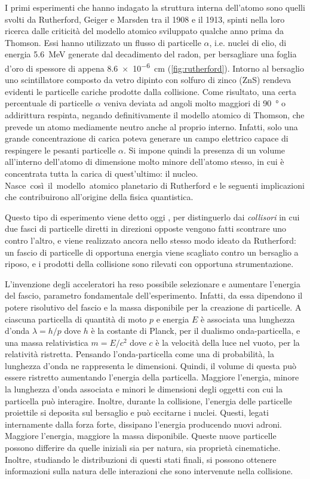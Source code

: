 \documentclass[../main.tex]{subfiles}
\begin{document}
I primi esperimenti che hanno indagato la struttura interna dell'atomo sono quelli svolti da Rutherford, Geiger e Marsden tra il 1908 e il 1913, spinti nella loro ricerca dalle criticità del modello atomico sviluppato qualche anno prima da Thomson. Essi hanno utilizzato un flusso di particelle $\alpha$, i.e. nuclei di elio, di energia \SI{5.6}{\MeV} generate dal decadimento del radon, per bersagliare una foglia d'oro di spessore di appena \SI{8.6e-6}{\cm} (\autoref{fig:rutherford}). Intorno al bersaglio uno scintillatore composto da vetro dipinto con solfuro di zinco (ZnS) rendeva evidenti le particelle cariche prodotte dalla collisione. Come risultato, una certa percentuale di particelle $\alpha$ veniva deviata ad angoli molto maggiori di \SI{90}{°} o addirittura respinta, negando definitivamente il modello atomico di Thomson, che prevede un atomo mediamente neutro anche al proprio interno. Infatti, solo una grande concentrazione di carica poteva generare un campo elettrico capace di respingere le pesanti particelle $\alpha$. Si impone quindi la presenza di un volume all'interno dell'atomo di dimensione molto minore dell'atomo stesso, in cui è concentrata tutta la carica di quest'ultimo: il nucleo. \mbox{Nasce così il modello atomico} planetario di Rutherford e le seguenti implicazioni che contribuirono all'origine della fisica quantistica.

Questo tipo di esperimento viene detto oggi , per distinguerlo dai \emph{collisori} in cui due fasci di particelle diretti in direzioni opposte vengono fatti scontrare uno contro l'altro, e viene realizzato ancora nello stesso modo ideato da Rutherford: un fascio di particelle di opportuna energia viene scagliato contro un bersaglio a riposo, e i prodotti della collisione sono rilevati con opportuna strumentazione.

L'invenzione degli acceleratori ha reso possibile selezionare e aumentare l'energia del fascio, parametro fondamentale dell'esperimento.
Infatti, da essa dipendono il potere risolutivo del fascio e la massa disponibile per la creazione di particelle.
A ciascuna particella di quantità di moto $p$ e energia $E$ è associata una lunghezza d'onda $\lambda = h / p $ dove $h$ è la costante di Planck, per il dualismo onda-particella, e una massa relativistica $m = E / c^2$ dove $c$ è la velocità della luce nel vuoto, per la relatività ristretta. 
Pensando l'onda-particella come una  di probabilità, la lunghezza d'onda ne rappresenta le dimensioni. Quindi, il volume di questa  può essere ristretto aumentando l'energia della particella. Maggiore l'energia, minore la lunghezza d'onda associata e minori le dimensioni degli oggetti con cui la particella può interagire. Inoltre, durante la collisione, l'energia delle particelle proiettile si deposita sul bersaglio e può eccitarne i nuclei. Questi, legati internamente dalla forza forte, dissipano l'energia producendo nuovi adroni. Maggiore l'energia, maggiore la massa disponibile.
Queste nuove particelle possono differire da quelle iniziali sia per natura, sia proprietà cinematiche. Inoltre, studiando le distribuzioni di questi stati finali, si possono ottenere informazioni sulla natura delle interazioni che sono intervenute nella collisione.
\end{document}

